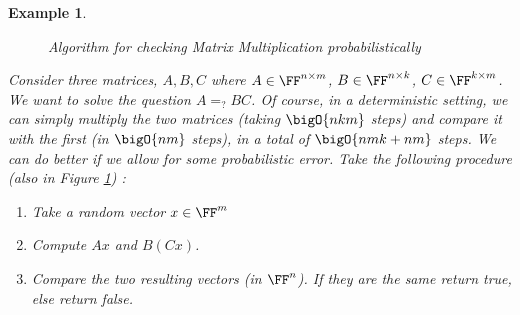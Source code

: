 \documentclass{article}
\newtheorem{example}{Example}
\begin{document}
\begin{example}

    \begin{figure}[H]
        \centering
        \caption{Algorithm for checking Matrix Multiplication probabilistically}
        \label{matrixmultiplication}
    \end{figure}

    Consider three matrices, $A, B, C$ where $A \in \FF^{n \times m}$, $B \in \FF^{n \times k}$, $C \in \FF^{k \times m}$.
    We want to solve the question $A =_? B C$. Of course, in a deterministic setting, we can simply multiply the two matrices (taking $\bigO{nkm}$ steps) and compare it with the first (in $\bigO{nm}$ steps), in a total of $\bigO{nmk + nm}$ steps.
    We can do better if we allow for some probabilistic error. Take the following procedure (also in Figure \ref{matrixmultiplication}) :
    \begin{enumerate}
        \item Take a random vector $x \in \FF^m$
        \item Compute $Ax$ and $B(Cx)$.
        \item Compare the two resulting vectors (in $\FF^n$). If they are the same return true, else return false.
    \end{enumerate}

\end{example}
\end{document}
